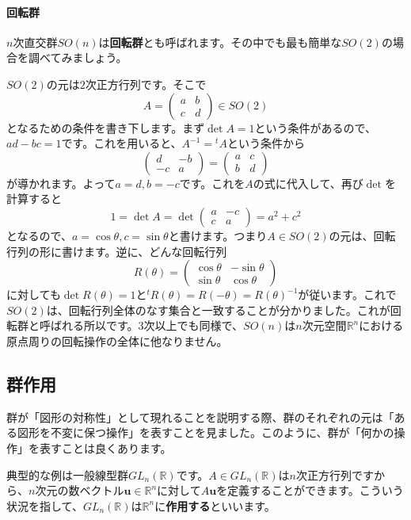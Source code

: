 \paragraph{回転群}

$n$次直交群$SO(n)$は\textbf{回転群}とも呼ばれます。その中でも最も簡単な$SO(2)$の場合を調べてみましょう。

$SO(2)$の元は$2$次正方行列です。そこで
\[
A = 
\begin{pmatrix}
a & b \\
c & d
\end{pmatrix} \in SO(2)
\]
となるための条件を書き下します。まず$\det A = 1$という条件があるので、$ad - bc = 1$です。これを用いると、$A^{-1} = {}^t\!A$という条件から
\[
\begin{pmatrix}
d & -b \\
-c & a
\end{pmatrix}
=
\begin{pmatrix}
a & c \\
b & d
\end{pmatrix}
\]
が導かれます。よって$a = d, b = -c$です。これを$A$の式に代入して、再び$\det$を計算すると
\[
1 = \det A =
\det
\begin{pmatrix}
a & -c \\
c & a
\end{pmatrix}
= a^2 + c^2
\]
となるので、$a = \cos \theta, c = \sin \theta$と書けます。つまり$A \in SO(2)$の元は、回転行列の形に書けます。逆に、どんな回転行列
\[
R(\theta) = 
\begin{pmatrix}
\cos \theta & -\sin \theta \\
\sin \theta & \cos \theta
\end{pmatrix}
\]
に対しても$\det R(\theta) = 1$と${}^t R(\theta) = R(-\theta) = R(\theta)^{-1}$が従います。これで$SO(2)$は、回転行列全体のなす集合と一致することが分かりました。これが回転群と呼ばれる所以です。$3$次以上でも同様で、$SO(n)$は$n$次元空間$\mathbb{R}^n$における原点周りの回転操作の全体に他なりません。

\subsection{群作用}

群が「図形の対称性」として現れることを説明する際、群のそれぞれの元は「ある図形を不変に保つ操作」を表すことを見ました。このように、群が「何かの操作」を表すことは良くあります。

典型的な例は一般線型群$GL_n(\mathbb{R})$です。$A \in GL_n(\mathbb{R})$は$n$次正方行列ですから、$n$次元の数ベクトル$\bm{u} \in \mathbb{R}^n$に対して$A\bm{u}$を定義することができます。こういう状況を指して、$GL_n(\mathbb{R})$は$\mathbb{R}^n$に\textbf{作用する}といいます。

